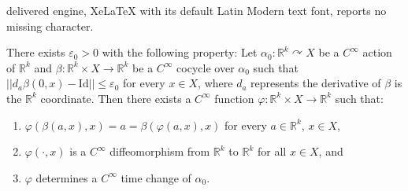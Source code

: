 \documentclass[10pt,a4paper]{amsart}
\newcommand{\R}{\mathbb{R}}
\newcommand{\id}{\mathrm{Id}}
\newcommand{\norm}[1]{{\left|\left| #1 \right|\right|}}
\newcommand{\ve}{\varepsilon}
\begin{document}
delivered engine, XeLaTeX with its default Latin Modern text font, reports no missing character.
\begin{lemma}
\label{lem:build-time-change}
There exists $\ve_0 > 0$ with the following property: Let $\alpha_0 : \R^k \curvearrowright X$ be a $C^\infty$ action of $\R^k$ and $\beta : \R^k \times X \to \R^k$ be a $C^\infty$ cocycle over $\alpha_0$ such that $\norm{d_a\beta(0,x) - \id} \le \ve_0$ for every $x \in X$, where $d_a$ represents the derivative of $\beta$ is the $\R^k$ coordinate. Then there exists a $C^\infty$ function $\varphi : \R^k \times X \to { \R^k}$ such that:

\begin{enumerate}
\item $\varphi(\beta(a,x),x) = a = \beta(\varphi(a,x),x)$ for every $a \in \R^k$, $x \in X$,
\item $\varphi(\cdot, x)$ is a $C^\infty$ diffeomorphism from $\R^k$ to $\R^k$ {  for all $x \in X$}, and
\item $\varphi$ determines a $C^\infty$ time change of $\alpha_0$.
\end{enumerate}
\end{lemma}
\end{document}

